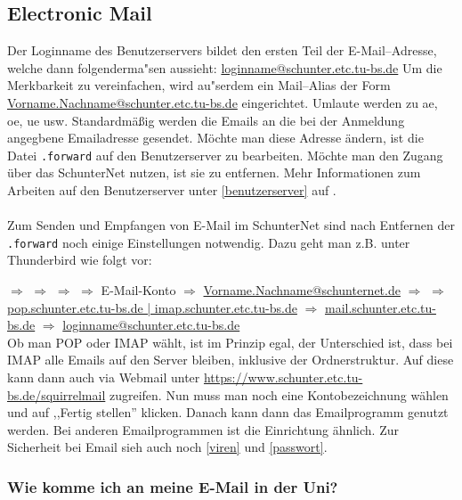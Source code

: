 
\subsection{Electronic Mail}
Der Loginname des Benutzerservers bildet den ersten Teil der \glossar
E-Mail--Adresse, welche dann folgenderma"sen aussieht:
\url{loginname@schunter.etc.tu-bs.de}
Um die Merkbarkeit zu vereinfachen, wird au"serdem ein Mail--Alias der Form
\url{Vorname.Nachname@schunter.etc.tu-bs.de} eingerichtet. Umlaute werden zu
ae, oe, ue usw.  Standardmäßig werden die Emails an die bei der
Anmeldung angegbene Emailadresse gesendet. Möchte man diese Adresse
ändern, ist die Datei \texttt{.forward} auf den Benutzerserver zu bearbeiten.
Möchte man den Zugang über das SchunterNet nutzen, ist sie zu entfernen.
Mehr Informationen zum Arbeiten auf den Benutzerserver unter
\ref{benutzerserver} auf \pageref{benutzerserver}.\\\\
Zum Senden und Empfangen von E-Mail im SchunterNet sind nach Entfernen
der \texttt{.forward} noch einige Einstellungen notwendig. Dazu geht man z.B. unter
Thunderbird wie folgt vor:

 $\Rightarrow$  $\Rightarrow$
 $\Rightarrow$  $\Rightarrow$
\mbox{E-Mail-Konto} $\Rightarrow$ 
\mbox{\url{Vorname.Nachname@schunternet.de}} $\Rightarrow$ 
$\Rightarrow$ 
\mbox{\url{pop.schunter.etc.tu-bs.de | imap.schunter.etc.tu-bs.de}}
$\Rightarrow$ 
\mbox{\url{mail.schunter.etc.tu-bs.de}} $\Rightarrow$ 
\mbox{\url{loginname@schunter.etc.tu-bs.de}}\\
 Ob man POP oder IMAP wählt, ist im Prinzip egal, der Unterschied ist,
dass bei IMAP alle Emails auf den Server bleiben, inklusive der
Ordnerstruktur. Auf diese kann dann auch via Webmail unter
\url{https://www.schunter.etc.tu-bs.de/squirrelmail} zugreifen. 
Nun muss man noch eine Kontobezeichnung wählen und auf ,,Fertig
stellen'' klicken. Danach kann dann das Emailprogramm genutzt werden.
Bei anderen Emailprogrammen ist die Einrichtung ähnlich. 
Zur Sicherheit bei Email sieh auch noch \ref{viren} und \ref{passwort}.


\subsubsection*{Wie komme ich an meine E-Mail in der Uni?}

